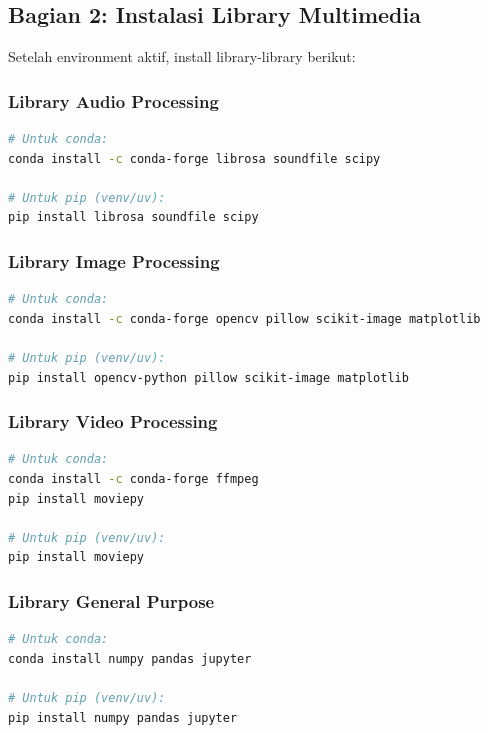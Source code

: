 \documentclass[11pt,a4paper]{article}
\begin{document}
\subsection{Bagian 2: Instalasi Library Multimedia}
Setelah environment aktif, install library-library berikut:

\subsubsection{Library Audio Processing}
\begin{lstlisting}[language=bash, caption=Instalasi library audio]
# Untuk conda:
conda install -c conda-forge librosa soundfile scipy

# Untuk pip (venv/uv):
pip install librosa soundfile scipy
\end{lstlisting}

\subsubsection{Library Image Processing}
\begin{lstlisting}[language=bash, caption=Instalasi library image]
# Untuk conda:
conda install -c conda-forge opencv pillow scikit-image matplotlib

# Untuk pip (venv/uv):
pip install opencv-python pillow scikit-image matplotlib
\end{lstlisting}

\subsubsection{Library Video Processing}
\begin{lstlisting}[language=bash, caption=Instalasi library video]
# Untuk conda:
conda install -c conda-forge ffmpeg
pip install moviepy

# Untuk pip (venv/uv):
pip install moviepy
\end{lstlisting}

\subsubsection{Library General Purpose}
\begin{lstlisting}[language=bash, caption=Instalasi library umum]
# Untuk conda:
conda install numpy pandas jupyter

# Untuk pip (venv/uv):
pip install numpy pandas jupyter
\end{lstlisting}
\end{document}
